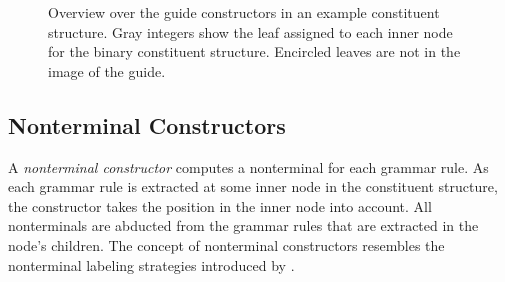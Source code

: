 \documentclass[../../document.tex]{subfiles}
\begin{document}
    \begin{figure}
        \begin{minipage}{.27\textwidth}
            \resizebox{\textwidth}{!}{}
        \end{minipage}\hfill
        \begin{minipage}{.27\textwidth}
            \resizebox{\textwidth}{!}{}
        \end{minipage}\hfill
        \begin{minipage}{.27\textwidth}
            \resizebox{\textwidth}{!}{}
        \end{minipage}

        \vspace{.5cm}

        \begin{minipage}[b]{.27\textwidth}
            \resizebox{\textwidth}{!}{}
        \end{minipage}\hfill
        \begin{minipage}[b]{.27\textwidth}
            \resizebox{\textwidth}{!}{}
        \end{minipage}\hfill
        \begin{minipage}[b]{.27\textwidth}
            \resizebox{\textwidth}{!}{}
        \end{minipage}

        \caption{\label{fig:guides}
            Overview over the guide constructors in an example constituent structure.
            Gray integers show the leaf assigned to each inner node for the binary constituent structure.
            Encircled leaves are not in the image of the guide.}
    \end{figure}

    \subsection{Nonterminal Constructors}
    A \emph{nonterminal constructor} computes a  nonterminal for each grammar rule.
    As each grammar rule is extracted at some inner node in the constituent structure, the constructor takes the position in the inner node into account.
    All  nonterminals are abducted from the grammar rules that are extracted in the node's children.
    The concept of nonterminal constructors resembles the nonterminal labeling strategies introduced by \citet[Sec.~6.2]{Geb21}.
\end{document}
